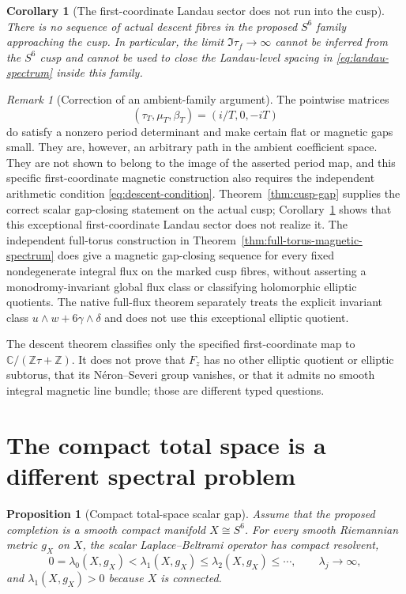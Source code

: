 \documentclass[11pt]{article}
\numberwithin{equation}{section}
\newtheorem{proposition}[theorem]{Proposition}
\newtheorem{corollary}[theorem]{Corollary}
\theoremstyle{definition}
\theoremstyle{remark}
\newtheorem{remark}[theorem]{Remark}
\newcommand{\C}{\mathbb C}
\newcommand{\Z}{\mathbb Z}
\begin{document}
\begin{corollary}[The first-coordinate Landau sector does not run into the cusp]\label{cor:no-landau-cusp}
There is no sequence of actual descent fibres in the proposed $S^6$ family approaching the cusp.  In particular, the limit $\Im\tau_f\to\infty$ cannot be inferred from the $S^6$ cusp and cannot be used to close the Landau-level spacing in \eqref{eq:landau-spectrum} inside this family.
\end{corollary}

\begin{remark}[Correction of an ambient-family argument]
The pointwise matrices
\[
 (\tau_T,\mu_T,\beta_T)=(i/T,0,-iT)
\]
 do satisfy a nonzero period determinant and make certain flat or magnetic gaps small.  They are, however, an arbitrary path in the ambient coefficient space.  They are not shown to belong to the image of the asserted period map, and this specific first-coordinate magnetic construction also requires the independent arithmetic condition \eqref{eq:descent-condition}.  Theorem~\ref{thm:cusp-gap} supplies the correct scalar gap-closing statement on the actual cusp; Corollary~\ref{cor:no-landau-cusp} shows that this exceptional first-coordinate Landau sector does not realize it.  The independent full-torus construction in Theorem~\ref{thm:full-torus-magnetic-spectrum} does give a magnetic gap-closing sequence for every fixed nondegenerate integral flux on the marked cusp fibres, without asserting a monodromy-invariant global flux class or classifying holomorphic elliptic quotients.  The native full-flux theorem separately treats the explicit invariant class $u\wedge w+6\gamma\wedge\delta$ and does not use this exceptional elliptic quotient.

The descent theorem classifies only the specified first-coordinate map to
$\C/(\Z\tau+\Z)$.  It does not prove that $F_z$ has no other elliptic
quotient or elliptic subtorus, that its Néron--Severi group vanishes, or that
it admits no smooth integral magnetic line bundle; those are different typed
questions.
\end{remark}

\section{The compact total space is a different spectral problem}

\begin{proposition}[Compact total-space scalar gap]\label{prop:total-space}
Assume that the proposed completion is a smooth compact manifold $X\cong S^6$.  For every smooth Riemannian metric $g_X$ on $X$, the scalar Laplace--Beltrami operator has compact resolvent,
\[
 0=\lambda_0(X,g_X)<\lambda_1(X,g_X)\le\lambda_2(X,g_X)\le\cdots,
 \qquad \lambda_j\to\infty,
\]
and $\lambda_1(X,g_X)>0$ because $X$ is connected.
\end{proposition}
\end{document}
